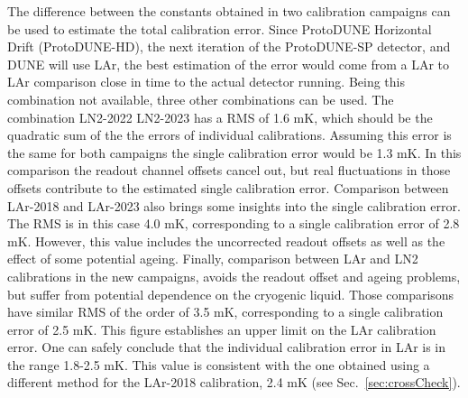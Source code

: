 The difference between the constants obtained in two calibration campaigns can be used to estimate the total calibration error. Since ProtoDUNE Horizontal Drift (ProtoDUNE-HD), the next iteration of the ProtoDUNE-SP detector, and DUNE will use LAr, the best estimation of the error would come from a LAr to LAr comparison close in time to the actual detector running. Being this combination not available, three other combinations can be used. The combination LN2-2022 LN2-2023 has a RMS of 1.6 mK, which should be the quadratic sum of the the errors of individual calibrations. Assuming this error is the same for both campaigns the single calibration error would be 1.3 mK. In this comparison the readout channel offsets cancel out, but real fluctuations in those offsets contribute to the estimated single calibration error. Comparison between LAr-2018 and LAr-2023 also brings some insights into the single calibration error. The RMS is in this case 4.0 mK, corresponding to a single calibration error of 2.8 mK. However, this value includes the uncorrected readout offsets as well as the effect of some potential ageing. Finally, comparison between LAr and LN2 calibrations in the new campaigns, avoids the readout offset and ageing problems, but suffer from potential dependence on the cryogenic liquid. Those comparisons have similar RMS of the order of 3.5 mK, corresponding to a single calibration error of 2.5 mK. This figure establishes an upper limit on the LAr calibration error. One can safely conclude that the individual calibration error in LAr is in the range 1.8-2.5 mK. This value is consistent with the one obtained using a different method for the LAr-2018 calibration, 2.4 mK (see Sec.~\ref{sec:crossCheck}).